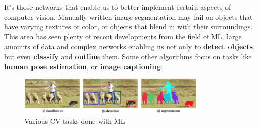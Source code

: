 \documentclass{article}
\begin{document}
It's those networks that enable us to better implement certain aspects of computer vision. Manually written image segmentation may fail on objects that have varying textures or color, or objects that blend in with their surroundings. This area has seen plenty of recent developments from the field of ML, large amounts of data and complex networks enabling us not only to \textbf{detect objects}, but even \textbf{classify} and \textbf{outline} them. Some other algorithms focus on tasks like \textbf{human pose estimation}, or \textbf{image captioning}. 
\begin{figure}[!htb]
    \vspace{-6pt}
    \begin{center}
        \includegraphics[width=0.8\textwidth]{ML_objects.jpg}
    \end{center}
    \vspace{-20pt}
    \caption{Various CV tasks done with ML}
    \vspace{-20pt}
\end{figure}
\end{document}
